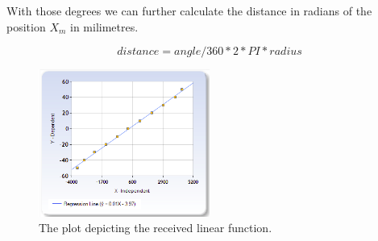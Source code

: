 \documentclass[12pt, a4paper]{article}
\begin{document}
\vspace{1cm}


With those degrees we can further calculate the distance in radians of the position $X_m$ in milimetres.

\begin{equation*}
distance = angle / 360 * 2 * PI * radius
\end{equation*}


\begin{figure}
	\centering
	\includegraphics[width=0.5\textwidth]{readings_plot}
	\caption{The plot depicting the received linear function.}
	\label{fig:readings_plot}
\end{figure}


%
%
\end{document}
